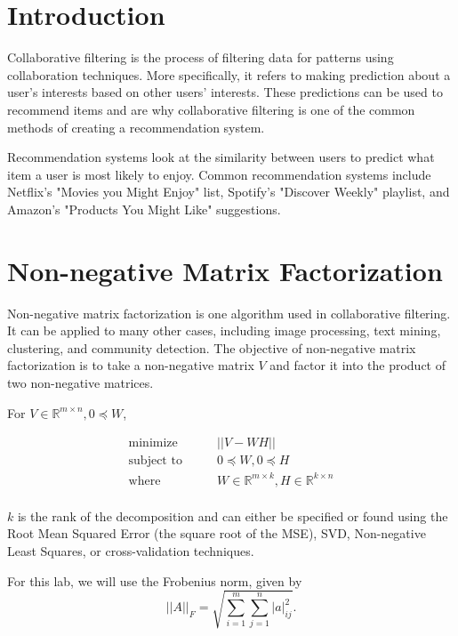 

\section*{Introduction}
Collaborative filtering is the process of filtering data for patterns using collaboration techniques.
More specifically, it refers to making prediction about a user's interests based on other users' interests.
These predictions can be used to recommend items and are why collaborative filtering is one of the common methods of creating a recommendation system.

Recommendation systems look at the similarity between users to predict what item a user is most likely to enjoy.
Common recommendation systems include Netflix's "Movies you Might Enjoy" list, Spotify's "Discover Weekly" playlist, and Amazon's "Products You Might Like" suggestions.  


\section*{Non-negative Matrix Factorization}
Non-negative matrix factorization is one algorithm used in collaborative filtering.
It can be applied to many other cases, including image processing, text mining, clustering, and community detection.
The objective of non-negative matrix factorization is to take a non-negative matrix $V$ and factor it into the product of two non-negative matrices. 

For $V\in\mathbb{R}^{m\times n}, 0\preceq W$,


\begin{align*}
\text{minimize}\qquad & ||V-WH|| \\
\text{subject to}\qquad &  0\preceq W, 0\preceq H\\
\text{where}\qquad & W\in\mathbb{R}^{m\times k}, H\in\mathbb{R}^{k\times n}\\
\end{align*}


$k$ is the rank of the decomposition and can either be specified or found using the Root Mean Squared Error (the square root of the MSE), SVD, Non-negative Least Squares, or cross-validation techniques.

For this lab, we will use the Frobenius norm, given by 
\[
||A||_{F} = \sqrt{\sum_{i=1}^{m}\sum_{j=1}^{n} |a|_{ij}^{2}}.
\]

